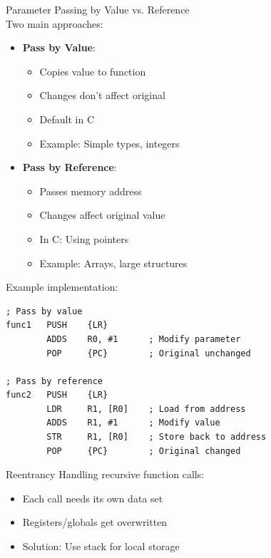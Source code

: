\begin{KR}{Parameter Passing by Value vs. Reference}\\
Two main approaches:
\begin{itemize}
  \item \textbf{Pass by Value}:
    \begin{itemize}
      \item Copies value to function
      \item Changes don't affect original
      \item Default in C
      \item Example: Simple types, integers
    \end{itemize}
  \item \textbf{Pass by Reference}:
    \begin{itemize}
      \item Passes memory address
      \item Changes affect original value
      \item In C: Using pointers
      \item Example: Arrays, large structures
    \end{itemize}
\end{itemize}

Example implementation:
\begin{lstlisting}[language=armasm, style=basesmol]
; Pass by value
func1   PUSH    {LR}
        ADDS    R0, #1      ; Modify parameter
        POP     {PC}        ; Original unchanged

; Pass by reference
func2   PUSH    {LR}
        LDR     R1, [R0]    ; Load from address
        ADDS    R1, #1      ; Modify value
        STR     R1, [R0]    ; Store back to address
        POP     {PC}        ; Original changed
\end{lstlisting}
\end{KR}

\begin{concept}{Reentrancy}
Handling recursive function calls:
\begin{itemize}
  \item Each call needs its own data set
  \item Registers/globals get overwritten
  \item Solution: Use stack for local storage
\end{itemize}
\end{concept}

